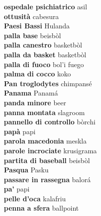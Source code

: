 \textbf{ ospedale psichiatrico  } asil \\
\textbf{ ottusità  } cabesura \\
\textbf{ Paesi Bassi  } Hulanda \\
\textbf{ palla base  } beisbòl \\
\textbf{ palla canestro  } basketbòl \\
\textbf{ palla da basket  } basketbòl \\
\textbf{ palla di fuoco  } bol’i fuego \\
\textbf{ palma di cocco  } koko \\
\textbf{ Pan troglodytes  } chimpansé \\
\textbf{ Panama  } Panamá \\
\textbf{ panda minore  } beer \\
\textbf{ panna montata  } slagroom \\
\textbf{ pannello di controllo  } bòrchi \\
\textbf{ papà  } papi \\
\textbf{ parola macedonia  } meskla \\
\textbf{ parole incrociate  } krusigrama \\
\textbf{ partita di baseball  } beisbòl \\
\textbf{ Pasqua  } Pasku \\
\textbf{ passare in rassegna  } balorá \\
\textbf{ pa’  } papi \\
\textbf{ pelle d’oca  } kalafriu \\
\textbf{ penna a sfera  } ballpoint \\
